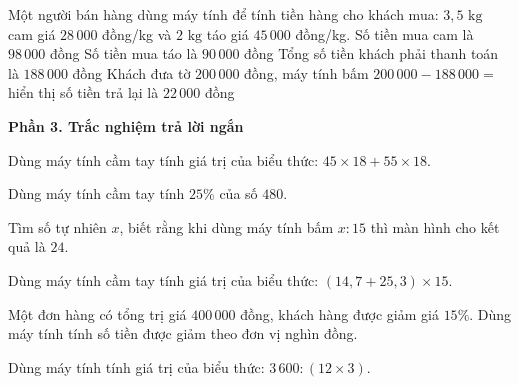 \begin{ex} %
Một người bán hàng dùng máy tính để tính tiền hàng cho khách mua: $3{,}5\text{ kg}$ cam giá $28\,000$ đồng/kg và $2\text{ kg}$ táo giá $45\,000$ đồng/kg.
\choiceTF
{\True Số tiền mua cam là $98\,000$ đồng}
{\True Số tiền mua táo là $90\,000$ đồng}
{\True Tổng số tiền khách phải thanh toán là $188\,000$ đồng}
{Khách đưa tờ $200\,000$ đồng, máy tính bấm $200\,000 - 188\,000 =$ hiển thị số tiền trả lại là $22\,000$ đồng}
\end{ex}

\textbf{Phần 3. Trắc nghiệm trả lời ngắn}

\begin{ex} %
Dùng máy tính cầm tay tính giá trị của biểu thức: $45 \times 18 + 55 \times 18$.
\end{ex}

\begin{ex} %
Dùng máy tính cầm tay tính $25\%$ của số $480$.
\end{ex}

\begin{ex} %
Tìm số tự nhiên $x$, biết rằng khi dùng máy tính bấm $x : 15$ thì màn hình cho kết quả là $24$.
\end{ex}

\begin{ex} %
Dùng máy tính cầm tay tính giá trị của biểu thức: $(14{,}7 + 25{,}3) \times 15$.
\end{ex}

\begin{ex} %
Một đơn hàng có tổng trị giá $400\,000$ đồng, khách hàng được giảm giá $15\%$. Dùng máy tính tính số tiền được giảm theo đơn vị nghìn đồng.
\end{ex}

\begin{ex} %
Dùng máy tính tính giá trị của biểu thức: $3\,600 : (12 \times 3)$.
\end{ex}
